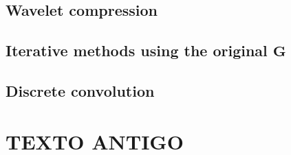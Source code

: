 \cite{barnes-lumley_2011}

\cite{oliveirajr-etal2013}

\cite{mendonca-2020}

\subsection{Wavelet compression}

\cite{li-oldenburg_2010}

\subsection{Iterative methods using the original $\mathbf{G}$}

\cite{xia-sprowl1991}

\cite{xia-etal1993}

\cite{siqueira-etal2017}

\cite{jirigalatu-ebbing2019}


\subsection{Discrete convolution}

\cite{takahashi-etal2020}

\cite{takahashi-etal2022}

\section{TEXTO ANTIGO}

